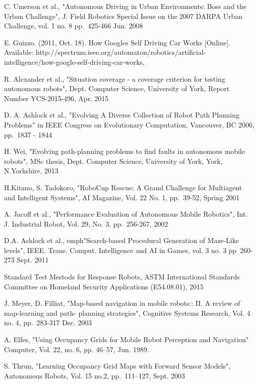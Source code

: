 \documentclass[authoryearcitations]{UoYCSproject}
\begin{document}
\begin{thebibliography}{56}
	C. Umerson et al.,
	"Autonomous Driving in Urban Environments: Boss and the Urban Challenge",
	J. Field Robotics Special Issue on the 2007 DARPA Urban Challenge,
	vol. 1 no. 8 pp.~425-466
	Jun. 2008
	
	E. Guizzo.
	(2011, Oct. 18).
	How Googles Self Driving Car Works [Online].
	Available: http://spectrum.ieee.org/automaton/robotics/artificial-intelligence/how-google-self-driving-car-works, 
	
	R. Alexander et al.,
	"Situation coverage - a coverage criterion for testing autonomous robots",
	Dept. Computer Science, University of York,
	Report Number YCS-2015-496,
	Apr. 2015
	
	D. A. Ashlock et al.,
	"Evolving A Diverse Collection of Robot Path Planning Problems" in
	IEEE Congress on Evolutionary Computation,
	Vancouver, BC
    2006, pp.~1837 - 1844 

	H. Wei,
	"Evolving path-planning problems to find faults in autonomous mobile robots",
	MSc thesis,
	Dept. Computer Science, University of York, York, N.Yorkshire, 2013

	H.Kitano, S. Tadokoro,
	"RoboCup Rescue: A Grand Challenge for Multiagent and Intelligent Systems",
	AI Magazine,
	Vol. 22 No. 1, pp.~39-52,
	Spring 2001

	A. Jacoff et al.,
	"Performance Evaluation of Autonomous Mobile Robotics",
	Int. J. Industrial Robot,
	Vol. 29, No. 3, pp.~256-267,
	2002

	D.A. Ashlock et al.,
	emph{"Search-based Procedural Generation of Maze-Like levels"},
	IEEE. Trans. Comput. Intelligence and AI in Games,
	vol. 3 no. 3 pp~260-273
	Sept. 2011
	
	Standard Test Mestods for Response Robots, 
	ASTM International Standards Committee on Homeland Security Applications (E54.08.01),
	2015
	
	J. Meyer, D. Filliat,
	"Map-based navigation in mobile robots:: II. A review of map-learning and path-	planning strategies",
	Cognitive Systems Research,
	Vol. 4 no. 4, pp.~283-317
	Dec. 2003
	
	A. Elfes,
	"Using Occupancy Grids for Mobile Robot Perception and Navigation"
	Computer, 
	Vol. 22, no. 6, pp. 46–57, 
	Jun. 1989.
	
	S. Thrun,
	"Learning Occupancy Grid Maps with Forward Sensor Models",
	Autonomous Robots,
	Vol. 15 no.2, pp.~111–127,
	Sept. 2003
	

\end{thebibliography}
\end{document}
